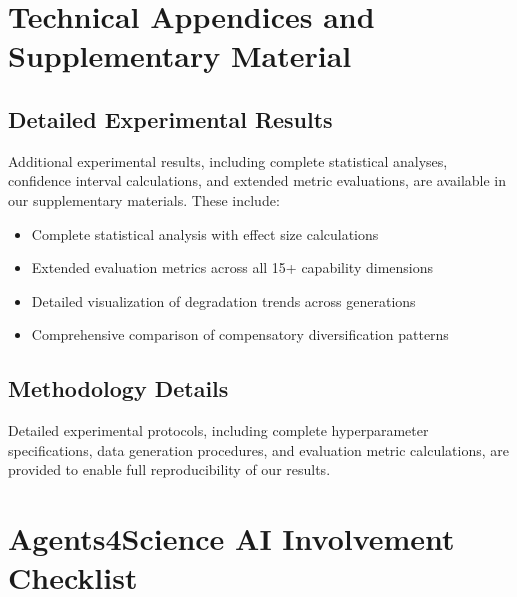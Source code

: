 \documentclass{article}
\begin{document}
\appendix

\section{Technical Appendices and Supplementary Material}

\subsection{Detailed Experimental Results}

Additional experimental results, including complete statistical analyses, confidence interval calculations, and extended metric evaluations, are available in our supplementary materials. These include:

\begin{itemize}
\item Complete statistical analysis with effect size calculations
\item Extended evaluation metrics across all 15+ capability dimensions
\item Detailed visualization of degradation trends across generations
\item Comprehensive comparison of compensatory diversification patterns
\end{itemize}

\subsection{Methodology Details}

Detailed experimental protocols, including complete hyperparameter specifications, data generation procedures, and evaluation metric calculations, are provided to enable full reproducibility of our results.

\section*{Agents4Science AI Involvement Checklist}
\end{document}
